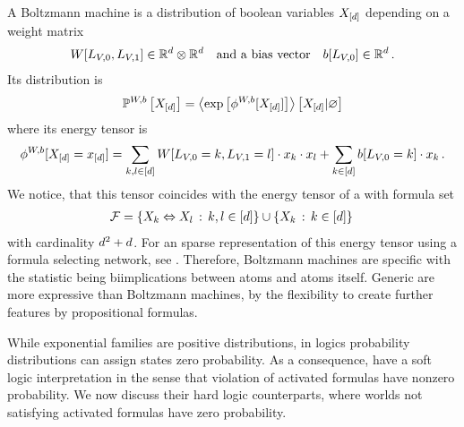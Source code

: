A Boltzmann machine is a distribution of boolean variables $X_{[d]}$ depending on a weight matrix %
\begin{align*}
    W[L_{V,0},L_{V,1}] \in\mathbb{R}^{d}\otimes\mathbb{R}^{d}
    \quad \text{and a bias vector} \quad b[L_{V,0}] \in\mathbb{R}^{d} \, .
\end{align*}
Its distribution is
\begin{align*}
    \mathbb{P}^{W,b}\left[X_{[d]}\right] = \left\langle \mathrm{exp}\left[\phi^{W,b}[X_{[d]}]\right]\right\rangle \left[ X_{[d]} | \varnothing \right]
\end{align*}
where its energy tensor is
\begin{align*}
    \phi^{W,b}[X_{[d]}=x_{[d]}] =
    \sum_{k,l \in [d]}
    W[L_{V,0}=k, L_{V,1}=l] \cdot x_{k} \cdot x_{l}
    + \sum_{k\in[d]} b[L_{V,0}=k] \cdot x_{k}\, .
\end{align*}
We notice, that this tensor coincides with the energy tensor of a \MarkovLogicNetwork{} with formula set
\begin{align*}
    \mathcal{F} = \{ X_{k} \Leftrightarrow X_{l} \,:\, k,l \in[d] \}
    \cup \{ X_{k}\,:\, k\in[d] \} \,
\end{align*}
with cardinality $d^2+d$.
For an sparse representation of this energy tensor using a formula selecting network, see .
Therefore, Boltzmann machines are specific \MarkovLogicNetworks{} with the statistic being biimplications between atoms and atoms itself.
Generic \MarkovLogicNetworks{} are more expressive than Boltzmann machines, by the flexibility to create further features by propositional formulas.

\sect{\HardLogicNetworks{}}\label{sec:hardNetworks} %

While exponential families are positive distributions, in logics probability distributions can assign states zero probability.
As a consequence, \MarkovLogicNetworks{} have a soft logic interpretation in the sense that violation of activated formulas have nonzero probability.
We now discuss their hard logic counterparts, where worlds not satisfying activated formulas have zero probability.


